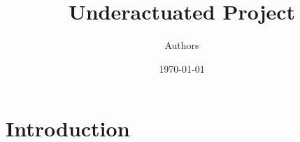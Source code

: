 \documentclass[12pt]{article}
\title{Underactuated Project}
\author{Authors}
\date{\today} %
\begin{document}
\setlength{\parindent}{0pt}

\maketitle
\todototoc
\listoftodos
\tableofcontents
\clearpage

\section{Introduction} 


  
  
\end{document}
